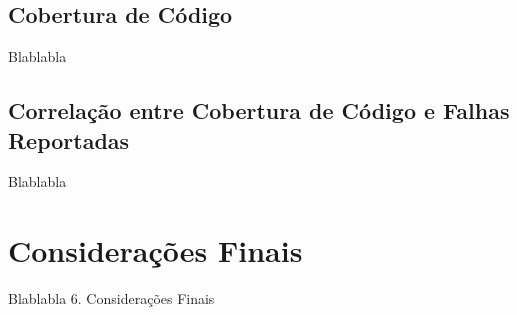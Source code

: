 \documentclass[11.5pt]{article}
\begin{document}

\subsection{Cobertura de Código}
Blablabla


\subsection{Correlação entre Cobertura de Código e Falhas Reportadas}
Blablabla




\section{Considerações Finais}
Blablabla
6. Considerações Finais







\clearpage
\end{document}
